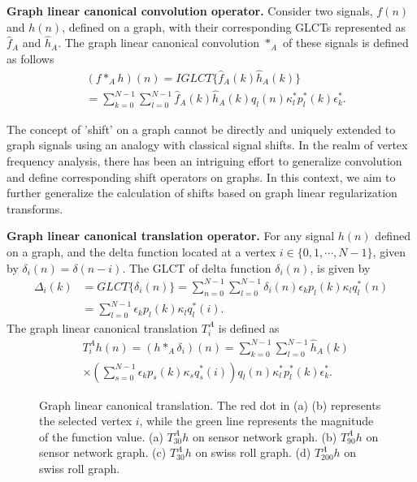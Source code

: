 \documentclass[lettersize,journal]{IEEEtran}
\begin{document}
\textbf{Graph linear canonical convolution operator.}
Consider two signals, $f(n)$ and $h(n)$, defined on a graph, with their corresponding GLCTs represented as $\hat{f}_A$ and $\hat{h}_A$. The graph linear canonical convolution $*_A$ of these signals is defined as follows
\begin{align} \label{eq9}
	&(f *_A h)(n) = IGLCT\{ \hat{f}_{A}(k) \hat{h}_{A}(k) \} \nonumber \\
	&= \sum_{k=0}^{N-1} \sum_{l=0}^{N-1} \hat{f}_{A}(k) \hat{h}_{A}(k) q_l(n) \kappa_l^{*} p_l^*(k) \epsilon_k^{*}.
\end{align}

The concept of 'shift' on a graph cannot be directly and uniquely extended to graph signals using an analogy with classical signal shifts. In the realm of vertex frequency analysis, there has been an intriguing effort to generalize convolution and define corresponding shift operators on graphs. In this context, we aim to further generalize the calculation of shifts based on graph linear regularization transforms.

\textbf{Graph linear canonical translation operator.}
For any signal $h(n)$ defined on a graph, and the delta function located at a vertex $ i \in \{0,1,\cdots,N-1\}$, given by $\delta_i(n)=\delta(n-i)$. The GLCT of delta function $\delta_i(n)$, is given by
\begin{align}
	\Delta_i(k)
	&=GLCT\{\delta_i(n)\}
	= \sum_{n=0}^{N-1} \sum_{l=0}^{N-1} \delta_i(n)  \epsilon_k p_l(k) \kappa_l q_l^*(n) \nonumber \\
	&= \sum_{l=0}^{N-1}\epsilon_k p_l(k) \kappa_l q_l^*(i).
\end{align}
The graph linear canonical translation $T_i^A$ is defined as
\begin{align}
	\label{eq2}
	&T_i^A h(n)=(h *_A \delta_i)(n) 
	= \sum_{k=0}^{N-1} \sum_{l=0}^{N-1} \hat{h}_{A}(k) \nonumber \\
	& \times
	\left(\sum_{s=0}^{N-1}\epsilon_k p_s(k) \kappa_s q_s^*(i)\right)
	 q_l(n) \kappa_l^{*} p_l^*(k) \epsilon_k^{*}.
\end{align}

\begin{figure}
	\centering
	\quad
	\caption{Graph linear canonical translation. The red dot in (a) (b) represents the selected vertex $i$, while the green line represents the magnitude of the function value. (a) $T_{30}^A h$ on sensor network graph. (b) $T_{90}^A h$ on sensor network graph. (c) $T_{30}^A h$ on swiss roll graph. (d) $T_{200}^A h$ on swiss roll graph. }\label{fig2}
\end{figure}
\end{document}
